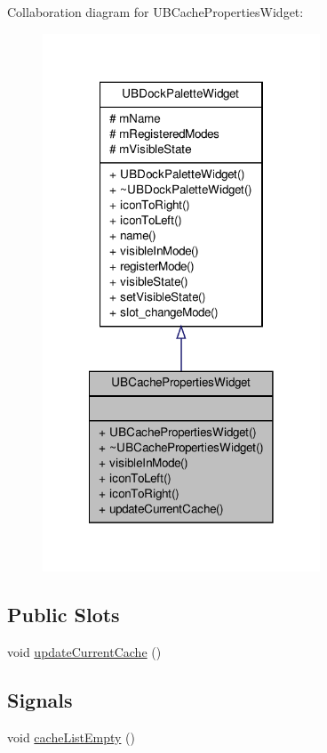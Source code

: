 Collaboration diagram for U\-B\-Cache\-Properties\-Widget\-:
\nopagebreak
\begin{figure}[H]
\begin{center}
\leavevmode
\includegraphics[width=234pt]{d1/d60/class_u_b_cache_properties_widget__coll__graph}
\end{center}
\end{figure}
\subsection*{Public Slots}
\begin{DoxyCompactItemize}
\item 
void \hyperlink{class_u_b_cache_properties_widget_a100e7726fb61b849fccbcee8dd198742}{update\-Current\-Cache} ()
\end{DoxyCompactItemize}
\subsection*{Signals}
\begin{DoxyCompactItemize}
\item 
void \hyperlink{class_u_b_cache_properties_widget_a26025f6bab6b05f3a79dec98d9617f9f}{cache\-List\-Empty} ()
\end{DoxyCompactItemize}
